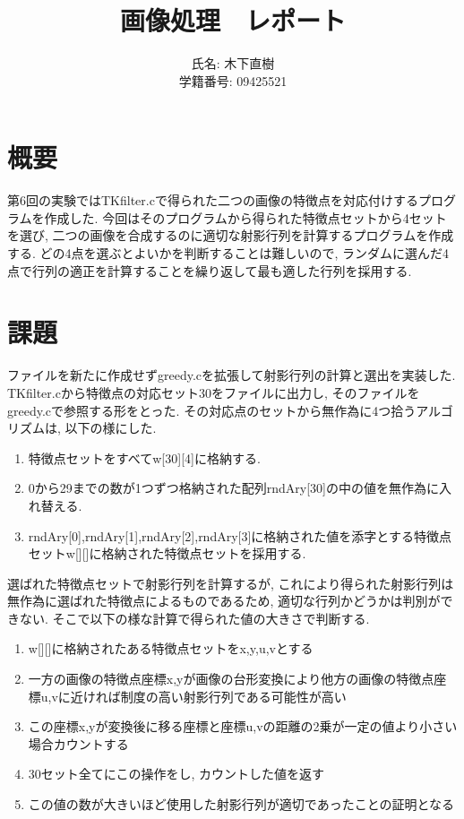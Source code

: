 \documentclass[a4j]{jarticle}
\title{画像処理　レポート}
\author{氏名: 木下直樹\\学籍番号: 09425521}
\begin{document}
\maketitle

\section{概要}
第6回の実験ではTKfilter.cで得られた二つの画像の特徴点を対応付けするプログラムを作成した. 
今回はそのプログラムから得られた特徴点セットから4セットを選び, 二つの画像を合成するのに適切な射影行列を計算するプログラムを作成する. 
どの4点を選ぶとよいかを判断することは難しいので, ランダムに選んだ4点で行列の適正を計算することを繰り返して最も適した行列を採用する.

\section{課題}
ファイルを新たに作成せずgreedy.cを拡張して射影行列の計算と選出を実装した. 
TKfilter.cから特徴点の対応セット30をファイルに出力し, そのファイルをgreedy.cで参照する形をとった. 
その対応点のセットから無作為に4つ拾うアルゴリズムは, 以下の様にした. 
\begin{enumerate}
\item 特徴点セットをすべてw[30][4]に格納する.
\item 0から29までの数が1つずつ格納された配列rndAry[30]の中の値を無作為に入れ替える. 
\item rndAry[0],rndAry[1],rndAry[2],rndAry[3]に格納された値を添字とする特徴点セットw[][]に格納された特徴点セットを採用する.
\end{enumerate}

選ばれた特徴点セットで射影行列を計算するが, これにより得られた射影行列は無作為に選ばれた特徴点によるものであるため, 適切な行列かどうかは判別ができない. そこで以下の様な計算で得られた値の大きさで判断する. 

\begin{enumerate}
\item w[][]に格納されたある特徴点セットをx,y,u,vとする
\item 一方の画像の特徴点座標x,yが画像の台形変換により他方の画像の特徴点座標u,vに近ければ制度の高い射影行列である可能性が高い
\item この座標x,yが変換後に移る座標と座標u,vの距離の2乗が一定の値より小さい場合カウントする
\item 30セット全てにこの操作をし, カウントした値を返す
\item この値の数が大きいほど使用した射影行列が適切であったことの証明となる
\end{enumerate}
\end{document}
